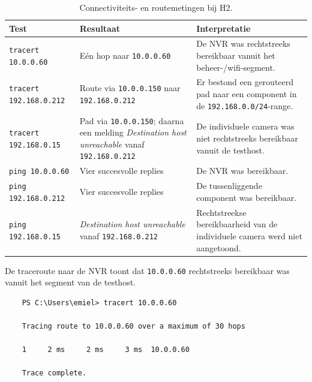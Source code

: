 \begin{table}[H]
    \centering
    \small
    \caption[Connectiviteits- en routemetingen bij H2]{Connectiviteits- en routemetingen bij H2.}
    \label{tab:bewijs-h2-connectiviteit}
    \begin{tabular}{p{}p{}p{}}
        \hline
        \textbf{Test} & \textbf{Resultaat} & \textbf{Interpretatie} \\
        \hline
        \texttt{tracert 10.0.0.60} &
        Eén hop naar \texttt{10.0.0.60} &
        De NVR was rechtstreeks bereikbaar vanuit het beheer-/wifi-segment. \\
        \hline
        \texttt{tracert 192.168.0.212} &
        Route via \texttt{10.0.0.150} naar \texttt{192.168.0.212} &
        Er bestond een gerouteerd pad naar een component in de \texttt{192.168.0.0/24}-range. \\
        \hline
        \texttt{tracert 192.168.0.15} &
        Pad via \texttt{10.0.0.150}; daarna een melding \textit{Destination host unreachable} vanaf \texttt{192.168.0.212} &
        De individuele camera was niet rechtstreeks bereikbaar vanuit de testhost. \\
        \hline
        \texttt{ping 10.0.0.60} &
        Vier succesvolle replies &
        De NVR was bereikbaar. \\
        \hline
        \texttt{ping 192.168.0.212} &
        Vier succesvolle replies &
        De tussenliggende component was bereikbaar. \\
        \hline
        \texttt{ping 192.168.0.15} &
        \textit{Destination host unreachable} vanaf \texttt{192.168.0.212} &
        Rechtstreekse bereikbaarheid van de individuele camera werd niet aangetoond. \\
        \hline
    \end{tabular}
\end{table}

De traceroute naar de NVR toont dat \texttt{10.0.0.60} rechtstreeks bereikbaar was vanuit het segment van de testhost.

\begin{verbatim}
    PS C:\Users\emiel> tracert 10.0.0.60
    
    Tracing route to 10.0.0.60 over a maximum of 30 hops
    
    1     2 ms     2 ms     3 ms  10.0.0.60
    
    Trace complete.
\end{verbatim}

